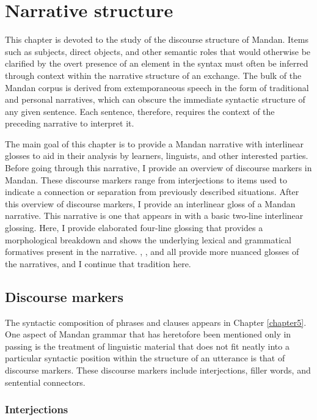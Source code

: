 \chapter{Narrative structure}\label{chapter6}

This chapter is devoted to the study of the discourse structure of Mandan. Items such as subjects, direct objects, and other semantic roles that would otherwise be clarified by the overt presence of an element in the syntax must often be inferred through context within the narrative structure of an exchange. The bulk of the Mandan corpus is derived from extemporaneous speech in the form of traditional and personal narratives, which can obscure the immediate syntactic structure of any given sentence. Each sentence, therefore, requires the context of the preceding narrative to interpret it.

The main goal of this chapter is to provide a Mandan narrative with interlinear glosses to aid in their analysis by learners, linguists, and other interested parties. Before going through this narrative, I provide an overview of discourse markers in Mandan. These discourse markers range from interjections to items used to indicate a connection or separation from previously described situations. After this overview of discourse markers, I provide an interlinear gloss of a Mandan narrative. This narrative is one that appears in \citet{hollow1973a} with a basic two-line interlinear glossing. Here, I provide elaborated four-line glossing that provides a morphological breakdown and shows the underlying lexical and grammatical formatives present in the narrative. \citet{coberly1979}, \citet{carter1991b}, and \citet{mixco1997a} all provide more nuanced glosses of the \citet{hollow1973a,hollow1973b} narratives, and I continue that tradition here.

\section{Discourse markers}\label{Ch6DiscourseMarkers}

The syntactic composition of phrases and clauses appears in Chapter \ref{chapter5}. One aspect of Mandan grammar that has heretofore been mentioned only in passing is the treatment of linguistic material that does not fit neatly into a particular syntactic position within the structure of an utterance is that of discourse markers. These discourse markers include interjections, filler words, and sentential connectors.

\subsection{Interjections}\label{Ch6Interjections}

